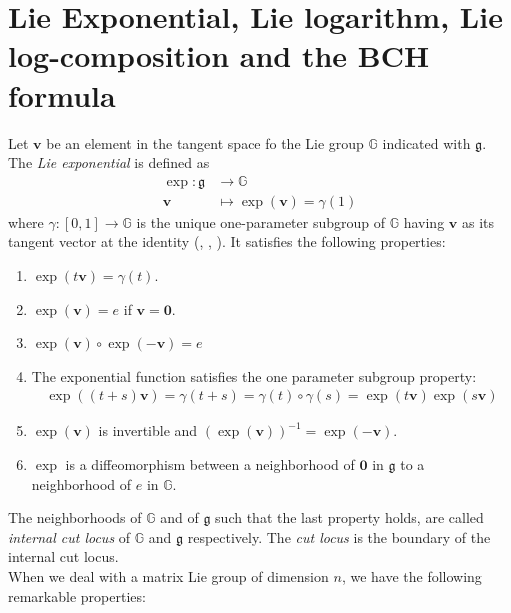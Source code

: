 \section{Lie Exponential, Lie logarithm, Lie log-composition and the BCH formula }\label{se:lie_exp_log_comp_bch}
Let $\mathbf{v}$ be an element in the tangent space fo the Lie group $\mathbb{G}$ indicated with $\mathfrak{g}$.
The \emph{Lie exponential} is defined as 
\begin{align*}
\exp :  \mathfrak{g} & \longrightarrow  \mathbb{G}  \\
\mathbf{v} &\longmapsto  \exp(\mathbf{v} ) = \gamma(1) %
\end{align*}
where $\gamma: [0,1]\rightarrow \mathbb{G} $ is the unique one-parameter subgroup of $\mathbb{G}$ having $\mathbf{v}$ as its tangent vector at the identity (\cite{do1992riemannian}, \cite{ebin2006singularities}, \cite{Arsigny:MRM:06}).
It satisfies the following properties:
\begin{enumerate}
	\item $\exp(t\mathbf{v}) =\gamma(t) $.
	\item $\exp(\mathbf{v}) = e$ if $\mathbf{v} = \mathbf{0}$.
	\item $\exp(\mathbf{v})\circ \exp(\mathbf{-v})  = e$
	\item The exponential function satisfies the one parameter subgroup property:
	\begin{align*}
	\exp((t+s)\mathbf{v}) = \gamma(t+s) = \gamma(t)\circ \gamma(s) = \exp(t\mathbf{v})\exp(s\mathbf{v})
	\end{align*}
	\item $\exp(\mathbf{v})$ is invertible and $(\exp(\mathbf{v}))^{-1} = \exp(-\mathbf{v})$.
	\item $\exp$ is a diffeomorphism between a neighborhood of $\mathbf{0}$ in $\mathfrak{g}$ to a neighborhood of $e$ in $\mathbb{G}$.
\end{enumerate}
The neighborhoods of $\mathbb{G}$ and of $\mathfrak{g}$ such that the last property holds, are called \emph{internal cut locus} of $\mathbb{G}$ and $\mathfrak{g}$ respectively. The \emph{cut locus} is the boundary of the internal cut locus.\\
When we deal with a matrix Lie group of dimension $n$, we have the following remarkable properties:
